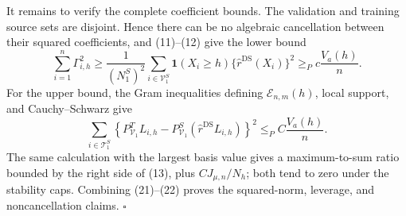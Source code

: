 It remains to verify the complete coefficient bounds.  The validation and training source sets are disjoint.  Hence there can be no algebraic cancellation between their squared coefficients, and (11)--(12) give the lower bound
\[
 \sum_{i=1}^n\Gamma_{i,h}^2
 \ge\frac1{(N^S_1)^2}\sum_{i\in\mathcal V^S_1}
 \mathbf1(X_i\ge h)\{\widehat r^{\mathrm{DS}}(X_i)\}^2
 \ge_P c\frac{V_a(h)}n.
\tag{21}
\]
For the upper bound, the Gram inequalities defining \(\mathcal E_{n,m}(h)\), local support, and Cauchy--Schwarz give
\[
 \sum_{i\in\mathcal T^S_1}
 \left\{P^T_{\mathcal V_1}L_{i,h}
 -P^S_{\mathcal V_1}(\widehat r^{\mathrm{DS}}L_{i,h})\right\}^2
 \le_P C\frac{V_a(h)}n.
\tag{22}
\]
The same calculation with the largest basis value gives a maximum-to-sum ratio bounded by the right side of (13), plus \(CJ_{\mu,n}/N_h\); both tend to zero under the stability caps.  Combining (21)--(22) proves the squared-norm, leverage, and noncancellation claims. \(\square\)